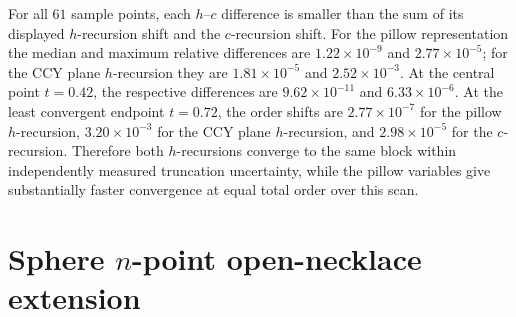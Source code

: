 \documentclass[11pt]{article}
\begin{document}
For all $61$ sample points, each $h$--$c$ difference is smaller than the sum
of its displayed $h$-recursion shift and the $c$-recursion shift.  For the
pillow representation the median and maximum relative differences are
$1.22\times10^{-9}$ and $2.77\times10^{-5}$; for the CCY plane
$h$-recursion they are $1.81\times10^{-5}$ and $2.52\times10^{-3}$.
At the central point $t=0.42$, the respective differences are
$9.62\times10^{-11}$ and $6.33\times10^{-6}$.  At the least convergent
endpoint $t=0.72$, the order shifts are $2.77\times10^{-7}$ for the pillow
$h$-recursion, $3.20\times10^{-3}$ for the CCY plane $h$-recursion, and
$2.98\times10^{-5}$ for the $c$-recursion.  Therefore both $h$-recursions
converge to the same block within independently measured truncation
uncertainty, while the pillow variables give substantially faster
convergence at equal total order over this scan.

\section{Sphere \texorpdfstring{$n$}{n}-point open-necklace extension}
\end{document}

